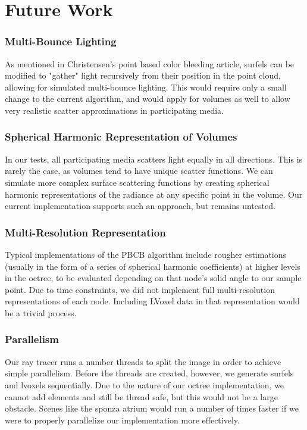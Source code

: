 \documentclass[runningheads]{llncs}
\begin{document}
\section{Future Work}

\subsubsection{Multi-Bounce Lighting}
As mentioned in Christensen's point based color bleeding article, surfels can be modified to "gather" light recursively from their position in the point cloud, allowing for simulated multi-bounce lighting.  This would require only a small change to the current algorithm, and would apply for volumes as well to allow very realistic scatter approximations in participating media.

\subsubsection{Spherical Harmonic Representation of Volumes}
In our tests, all participating media scatters light equally in all directions.  This is rarely the case, as volumes tend to have unique scatter functions.  We can simulate more complex surface scattering functions by creating spherical harmonic representations of the radiance at any specific point in the volume.  Our current implementation supports such an approach, but remains untested.

\subsubsection{Multi-Resolution Representation}
Typical implementations of the PBCB algorithm include rougher estimations (usually in the form of a series of spherical harmonic coefficients) at higher levels in the octree, to be evaluated depending on that node's solid angle to our sample point.  Due to time constraints, we did not implement full multi-resolution representations of each node.  Including LVoxel data in that representation would be a trivial process.

\subsubsection{Parallelism}
Our ray tracer runs a number threads to split the image in order to achieve simple parallelism.  Before the threads are created, however, we generate surfels and lvoxels sequentially.  Due to the nature of our octree implementation, we cannot add elements and still be thread safe, but this would not be a large obstacle.  Scenes like the sponza atrium would run a number of times faster if we were to properly parallelize our implementation more effectively.
\end{document}
